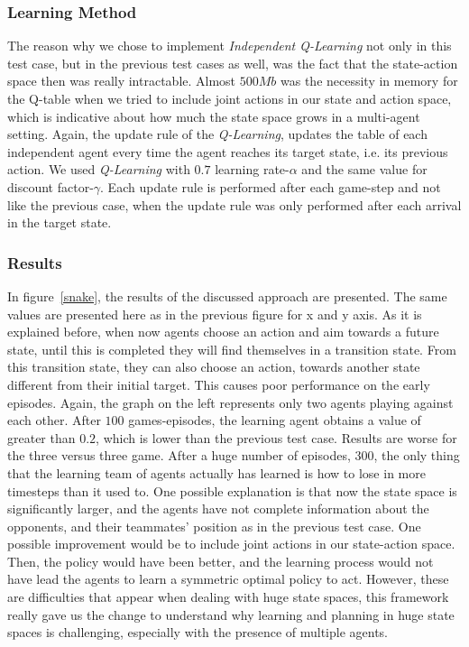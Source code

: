 \documentclass[conference]{IEEEtran}
\begin{document}
\subsubsection{Learning Method}
The reason why we chose to implement \textit{Independent Q-Learning} not only in this test case, but in the previous test cases as well, was the fact that the state-action space then was really intractable. Almost $500Mb$ was the necessity in memory for the Q-table when we tried to include joint actions in our state and action space, which is indicative about how much the state space grows in a multi-agent setting.
Again, the update rule of the \textit{Q-Learning}, updates the table of each independent agent every time the agent reaches its target state, i.e. its previous action. We used \textit{Q-Learning} with $0.7$ learning rate-$\alpha$ and the same value for discount factor-$\gamma$. Each update rule is performed after each game-step and not like the previous case, when the update rule was only performed after each arrival in the target state.
\subsubsection{Results}
In figure~\ref{snake}, the results of the discussed approach are presented. The same values are presented here as in the previous figure for x and y axis. As it is explained before, when now agents choose an action and aim towards a future state, until this is completed they will find themselves in a transition state. From this transition state, they can also choose an action, towards another state different from their initial target. This causes poor performance on the early episodes. Again, the graph on the left represents only two agents playing against each other. After $100$ games-episodes, the learning agent obtains a value of greater than $0.2$, which is lower than the previous test case. Results are worse for the three versus three game. After a huge number of episodes, $300$, the only thing that the learning team of agents actually has learned is how to lose in more timesteps than it used to. One possible explanation is that now the state space is significantly larger, and the agents have not complete information about the opponents, and their teammates' position as in the previous test case. One possible improvement would be to include joint actions in our state-action space. Then, the policy would have been better, and the learning process would not have lead the agents to learn a symmetric optimal policy to act. However, these are difficulties that appear when dealing with huge state spaces, this framework really gave us the change to understand why learning and planning in huge state spaces is challenging, especially with the presence of multiple agents.
\end{document}
